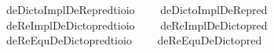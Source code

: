 \begin{isabellebody}
\isamarkupfalse%
\ deDictoImplDeRe{\isacharunderscore}pred{\isacharcolon}{\isacharcolon}{\isachardoublequoteopen}{\isacharparenleft}{\isacharprime}t{\isasymRightarrow}io{\isacharparenright}{\isasymRightarrow}io{\isachardoublequoteclose}\ \isanewline
\ \ \ {\isachardoublequoteopen}deDictoImplDeRe{\isacharunderscore}pred\ {\isasymtau}\ {\isasymequiv}\ \isactrlbold {\isasymforall}{\isasymalpha}{\isachardot}\ \isactrlbold {\isasymbox}{\isacharparenleft}{\isacharparenleft}{\isasymlambda}{\isasymbeta}{\isachardot}\ {\isacharparenleft}{\isasymalpha}\ {\isasymbeta}{\isacharparenright}{\isacharparenright}\ \isactrlbold {\isasymdown}{\isasymtau}{\isacharparenright}\ \isactrlbold {\isasymrightarrow}\ {\isacharparenleft}{\isacharparenleft}{\isasymlambda}{\isasymbeta}{\isachardot}\ \isactrlbold {\isasymbox}{\isacharparenleft}{\isasymalpha}\ {\isasymbeta}{\isacharparenright}{\isacharparenright}\ \isactrlbold {\isasymdown}{\isasymtau}{\isacharparenright}{\isachardoublequoteclose}\isanewline
{}\isamarkupfalse%
\ deReImplDeDicto{\isacharunderscore}pred{\isacharcolon}{\isacharcolon}{\isachardoublequoteopen}{\isacharparenleft}{\isacharprime}t{\isasymRightarrow}io{\isacharparenright}{\isasymRightarrow}io{\isachardoublequoteclose}\ \isanewline
\ \ \ {\isachardoublequoteopen}deReImplDeDicto{\isacharunderscore}pred\ {\isasymtau}\ {\isasymequiv}\ \isactrlbold {\isasymforall}{\isasymalpha}{\isachardot}\ {\isacharparenleft}{\isacharparenleft}{\isasymlambda}{\isasymbeta}{\isachardot}\ \isactrlbold {\isasymbox}{\isacharparenleft}{\isasymalpha}\ {\isasymbeta}{\isacharparenright}{\isacharparenright}\ \isactrlbold {\isasymdown}{\isasymtau}{\isacharparenright}\ \isactrlbold {\isasymrightarrow}\ \isactrlbold {\isasymbox}{\isacharparenleft}{\isacharparenleft}{\isasymlambda}{\isasymbeta}{\isachardot}\ {\isacharparenleft}{\isasymalpha}\ {\isasymbeta}{\isacharparenright}{\isacharparenright}\ \isactrlbold {\isasymdown}{\isasymtau}{\isacharparenright}{\isachardoublequoteclose}\isanewline
{}\isamarkupfalse%
\ deReEquDeDicto{\isacharunderscore}pred{\isacharcolon}{\isacharcolon}{\isachardoublequoteopen}{\isacharparenleft}{\isacharprime}t{\isasymRightarrow}io{\isacharparenright}{\isasymRightarrow}io{\isachardoublequoteclose}\ \isanewline
\ \ \ {\isachardoublequoteopen}deReEquDeDicto{\isacharunderscore}pred\ {\isasymtau}\ {\isasymequiv}\ \isactrlbold {\isasymforall}{\isasymalpha}{\isachardot}\ {\isacharparenleft}{\isacharparenleft}{\isasymlambda}{\isasymbeta}{\isachardot}\ \isactrlbold {\isasymbox}{\isacharparenleft}{\isasymalpha}\ {\isasymbeta}{\isacharparenright}{\isacharparenright}\ \isactrlbold {\isasymdown}{\isasymtau}{\isacharparenright}\ \isactrlbold {\isasymleftrightarrow}\ \isactrlbold {\isasymbox}{\isacharparenleft}{\isacharparenleft}{\isasymlambda}{\isasymbeta}{\isachardot}\ {\isacharparenleft}{\isasymalpha}\ {\isasymbeta}{\isacharparenright}{\isacharparenright}\ \isactrlbold {\isasymdown}{\isasymtau}{\isacharparenright}{\isachardoublequoteclose}%

\end{isabellebody}
